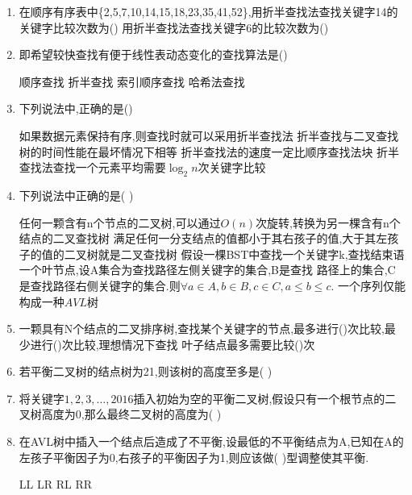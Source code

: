 \documentclass[12pt, a4paper, oneside, UTF8]{ctexbook}
\begin{document}
\begin{enumerate}
    \item 在顺序有序表中\{2,5,7,10,14,15,18,23,35,41,52\},用折半查找法查找关键字14的关键字比较次数为()
    用折半查找法查找关键字6的比较次数为() 

    \item 即希望较快查找有便于线性表动态变化的查找算法是() 
    \begin{choices}
        \task 顺序查找 
        \task 折半查找 
        \task 索引顺序查找 
        \task 哈希法查找 
    \end{choices}

    \item 下列说法中,正确的是() 
    \begin{choices}[1]
        \task 如果数据元素保持有序,则查找时就可以采用折半查找法 
        \task 折半查找与二叉查找树的时间性能在最坏情况下相等 
        \task 折半查找法的速度一定比顺序查找法块 
        \task 折半查找法查找一个元素平均需要$\log_2 n$次关键字比较 
    \end{choices}

    \item 下列说法中正确的是(    ) 
    \begin{choices}[1]
        \task 任何一颗含有n个节点的二叉树,可以通过$O(n)$次旋转,转换为另一棵含有n个结点的二叉查找树 
        \task 满足任何一分支结点的值都小于其右孩子的值,大于其左孩子的值的二叉树就是二叉查找树 
        \task 假设一棵BST中查找一个关键字k,查找结束语一个叶节点,设A集合为查找路径左侧关键字的集合,B是查找
        路径上的集合,C是查找路径右侧关键字的集合.则$\forall a\in A,b\in B,c\in C, a\leq b \leq c$. 
        \task 一个序列仅能构成一种$AVL$树
    \end{choices}

    \item 一颗具有N个结点的二叉排序树,查找某个关键字的节点,最多进行()次比较,最少进行()次比较,理想情况下查找
    叶子结点最多需要比较()次 

    \item 若平衡二叉树的结点树为21,则该树的高度至多是(   ) 

    \item 将关键字$1,2,3,\ldots,2016$插入初始为空的平衡二叉树,假设只有一个根节点的二叉树高度为0,那么最终二叉树的高度为(   ) 

    \item 在AVL树中插入一个结点后造成了不平衡,设最低的不平衡结点为A,已知在A的左孩子平衡因子为0,右孩子的平衡因子为1,则应该做(   )型调整使其平衡. 
    \begin{choices}
        \task LL \task LR \task RL \task RR 
    \end{choices}


\end{enumerate}
\end{document}
